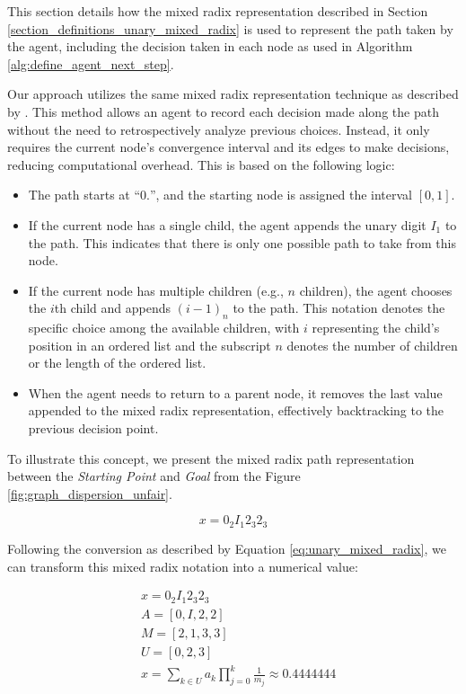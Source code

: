 This section details how the mixed radix representation described in Section \ref{section_definitions_unary_mixed_radix}
is used to represent the path taken by the agent, including the decision taken in each node as used in Algorithm \ref{alg:define_agent_next_step}.

Our approach utilizes the same mixed radix representation technique as described by .
This method allows an agent to record each decision made along the path without the need to retrospectively analyze previous choices.
Instead, it only requires the current node's convergence interval and its edges to make decisions, reducing computational overhead. This is based on the following logic:

\begin{itemize}
    \item The path starts at ``$0.$'', and the starting node is assigned the interval $[0,1]$.
    \item If the current node has a single child, the agent appends the unary digit $I_1$ to the path. This indicates that there is only one possible path to take from this node.
    \item If the current node has multiple children (e.g., $n$ children), the agent chooses the $i$th child and appends $(i-1)_n$ to the path. This notation denotes the specific choice among the available children, with $i$ representing the child's position in an ordered list and the subscript $n$ denotes the number of children or the length of the ordered list.
    \item When the agent needs to return to a parent node, it removes the last value appended to the mixed radix representation, effectively backtracking to the previous decision point.
\end{itemize}

To illustrate this concept, we present the mixed radix path representation between the \textit{Starting Point} and \textit{Goal} from the
Figure \ref{fig:graph_dispersion_unfair}.

\begin{equation}
    x = 0_{2}I_{1}2_{3}2_{3}
\end{equation}

Following the conversion as described by Equation \ref{eq:unary_mixed_radix}, 
we can transform this mixed radix notation into a numerical value:

\begin{align}
    & x=0_{2}I_{1}2_{3}2_{3}\\
    & A=[0,I,2,2]\\
    & M=[2,1,3,3]\\
    & U=[0,2,3]\\
    & x = \sum_{k \in U} a_{k} \prod_{j=0}^{k} \frac{1}{m_j} \approx 0.4444444
\end{align}


